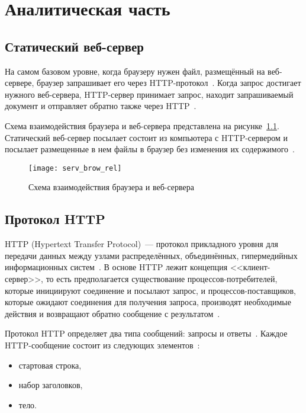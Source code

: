 \chapter{Аналитическая часть}

\section{Статический веб-сервер}

На самом базовом уровне, когда браузеру нужен файл, размещённый на веб-сервере, браузер запрашивает его через HTTP-протокол~\cite{mozilla_stserv}.
Когда запрос достигает нужного веб-сервера, HTTP-сервер принимает запрос, находит запрашиваемый документ и отправляет обратно также через HTTP~\cite{mozilla_stserv}.

Схема взаимодействия браузера и веб-сервера представлена на рисунке~\ref{serv_brow_rel}.
Статический веб-сервер посылает состоит из компьютера с HTTP-сервером и посылает размещенные в нем файлы в браузер без изменения их содержимого~\cite{mozilla_stserv}.

\begin{figure}[H]
	\centering
	\texttt{[image: serv\_brow\_rel]}
	\caption{Схема взаимодействия браузера и веб-сервера}
	\label{serv_brow_rel}
\end{figure}

\section{Протокол HTTP}

HTTP (Hypertext Transfer Protocol)~--- протокол прикладного уровня для передачи данных между узлами распределённых, объединённых, гипермедийных информационных систем~\cite{http}.
В основе HTTP лежит концепция <<клиент-сервер>>, то есть предполагается существование процессов-потребителей, которые инициируют соединение и посылают запрос, и процессов-поставщиков, которые ожидают соединения для получения запроса, производят необходимые действия и возвращают обратно сообщение с результатом~\cite{http}.

Протокол HTTP определяет два типа сообщений: запросы и ответы~\cite{http}.
Каждое HTTP-сообщение состоит из следующих элементов~\cite{http}:
\begin{itemize}
	\item стартовая строка,
	\item набор заголовков,
	\item тело.
\end{itemize}

